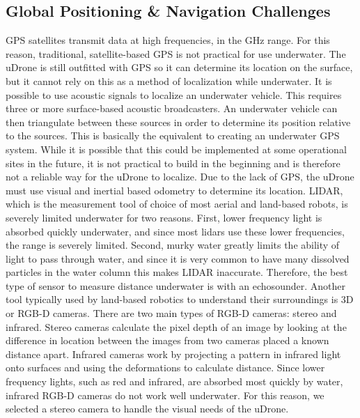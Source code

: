 \subsection{Global Positioning & Navigation Challenges}
GPS satellites transmit data at high frequencies, in the GHz range. For this reason, traditional, satellite-based GPS is not practical for use underwater. The uDrone is still outfitted with GPS so it can determine its location on the surface, but it cannot rely on this as a method of localization while underwater.
It is possible to use acoustic signals to localize an underwater vehicle. This requires three or more surface-based acoustic broadcasters. An underwater vehicle can then triangulate between these sources in order to determine its position relative to the sources. This is basically the equivalent to creating an underwater GPS system. While it is possible that this could be implemented at some operational sites in the future, it is not practical to build in the beginning and is therefore not a reliable way for the uDrone to localize.
Due to the lack of GPS, the uDrone must use visual and inertial based odometry to determine its location. LIDAR, which is the measurement tool of choice of most aerial and land-based robots, is severely limited underwater for two reasons. First, lower frequency light is absorbed quickly underwater, and since most lidars use these lower frequencies, the range is severely limited. Second, murky water greatly limits the ability of light to pass through water, and since it is very common to have many dissolved particles in the water column this makes LIDAR inaccurate. Therefore, the best type of sensor to measure distance underwater is with an echosounder. 
Another tool typically used by land-based robotics to understand their surroundings is 3D or RGB-D cameras. There are two main types of RGB-D cameras: stereo and infrared. Stereo cameras calculate the pixel depth of an image by looking at the difference in location between the images from two cameras placed a known distance apart. Infrared cameras work by projecting a pattern in infrared light onto surfaces and using the deformations to calculate distance. Since lower frequency lights, such as red and infrared, are absorbed most quickly by water, infrared RGB-D cameras do not work well underwater. For this reason, we selected a stereo camera to handle the visual needs of the uDrone. 
